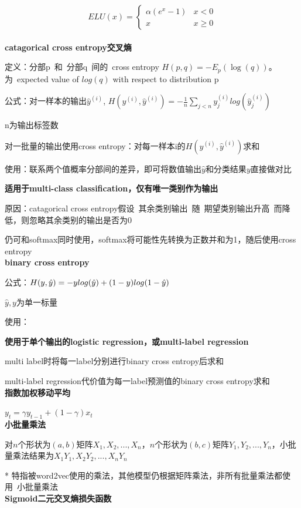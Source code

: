 \documentclass[UTF8]{ctexart}
\begin{document}
  \begin{equation*}
    ELU(x) = \begin{cases}
      \alpha (e^x - 1) & x < 0\\
      x & x \geq 0
    \end{cases}
  \end{equation*}\\
\textbf{catagorical cross entropy交叉熵}

  定义：分部p\ 和\ 分部q\ 间的\ cross entropy $H(p, q) = -E_p(\log (q))$。为\ expected value of $log (q)$ with respect to distribution p

  公式：对一样本的输出$\hat{y}^{(i)}$, $H(y^{(i)}, \hat{y}^{(i)}) = -\frac{1}{n}\sum_{j < n}y^{(i)}_jlog(\hat{y}^{(i)}_j)$

  \quad n为输出标签数

  \quad 对一批量的输出使用cross entropy：对每一样本i的$H(y^{(i)}, \hat{y}^{(i)})$求和

  使用：联系两个值概率分部间的差异，即可将数值输出$\hat{y}$和分类结果$y$直接做对比

  \quad \textbf{适用于multi-class classification，仅有唯一类别作为输出}

  \quad \quad 原因：catagorical cross entropy假设\ 其余类别输出\ 随\ 期望类别输出升高\ 而降低，则忽略其余类别的输出是否为0

  \quad 仍可和softmax同时使用，softmax将可能性先转换为正数并和为1，随后使用cross entropy\\
\textbf{binary cross entropy}

  公式：$H(y, \hat{y}) = -y \space log(\hat{y}) + (1 - y)log(1 - \hat{y})$

  \quad $\hat{y}, y$为单一标量
  
  使用：
  
  \quad \textbf{使用于单个输出的logistic regression，或multi-label regression}

  \quad \quad multi label时将每一label分别进行binary cross entropy后求和
  
  \quad multi-label regression代价值为每一label预测值的binary cross entropy求和\\
\textbf{指数加权移动平均}

  $y_t = \gamma y_{t-1}+(1-\gamma)x_t$\\
\textbf{小批量乘法}

  对$n$个形状为$(a, b)$矩阵$X_1, X_2, ..., X_n$，$n$个形状为$(b, c)$矩阵$Y_1, Y_2, ..., Y_n$，小批量乘法结果为$X_1Y_1, X_2Y_2, ..., X_nY_n$

  * 特指被word2vec使用的乘法，其他模型仍根据矩阵乘法，非所有批量乘法都使用\ 小批量乘法\\
\textbf{Sigmoid二元交叉熵损失函数}
\end{document}
